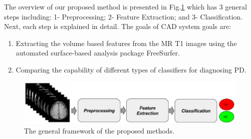 \documentclass[runningheads,a4paper]{llncs}
\begin{document}

The overview of our proposed method is presented in Fig.\ref{fig:framework}  which has $3$ general steps including: 1- Preprocessing; 2- Feature Extraction; and 3- Classification. Next, each step is explained in detail. The goals of CAD system goals are:
\begin{enumerate}
\item Extracting the volume based features from the MR T1 images using the automated surface-based analysis package FreeSurfer.
\item Comparing the capability of different types of classifiers for diagnosing PD.
\end{enumerate}

\begin{figure}[h!]
\includegraphics[scale=0.37]{flchart.png}
\caption{The general framework of the proposed methods.}
\label{fig:framework}
\end{figure}
\end{document}

